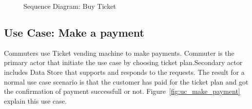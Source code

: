 \documentclass[a4paper,12pt]{report}
\begin{document}
\begin{figure}[!htbp]
	\centering
	\caption{\label{fig:seq_buy_ticket} Sequence Diagram: Buy Ticket}	
\end{figure}





\FloatBarrier
\subsection{Use Case: Make a payment}
Commuters use Ticket vending machine to make payments. Commuter is the primary actor that initiate the use case by choosing ticket plan.Secondary actor includes Data Store that supports and responds to the requests. The result for a normal use case scenario is that the customer has paid for the ticket plan and got the confirmation of payment successfull or not. Figure~\ref{fig:uc_make_payment} explain this use case.
\end{document}
